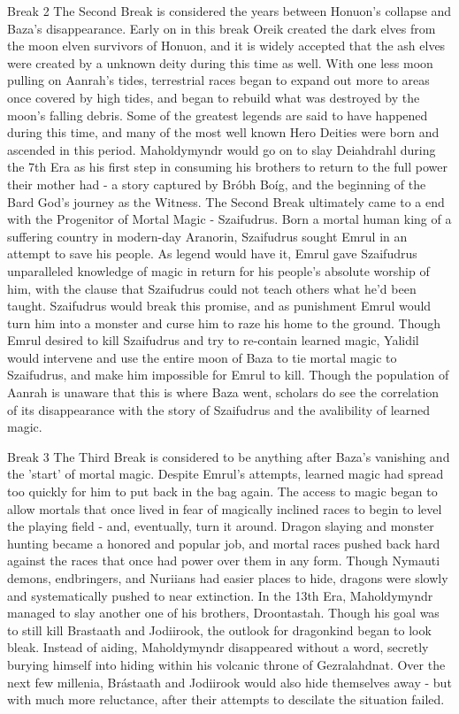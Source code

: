 Break 2
The Second Break is considered the years between Honuon's collapse and Baza's disappearance. Early on in this break Oreik created the dark elves from the moon elven survivors of Honuon, and it is widely accepted that the ash elves were created by a unknown deity during this time as well. With one less moon pulling on Aanrah's tides, terrestrial races began to expand out more to areas once covered by high tides, and began to rebuild what was destroyed by the moon's falling debris.
Some of the greatest legends are said to have happened during this time, and many of the most well known Hero Deities were born and ascended in this period. Maholdymyndr would go on to slay Deiahdrahl during the 7th Era as his first step in consuming his brothers to return to the full power their mother had - a story captured by Bróbh Boíg, and the beginning of the Bard God's journey as the Witness.
The Second Break ultimately came to a end with the Progenitor of Mortal Magic - Szaifudrus. Born a mortal human king of a suffering country in modern-day Aranorin, Szaifudrus sought Emrul in an attempt to save his people. As legend would have it, Emrul gave Szaifudrus unparalleled knowledge of magic in return for his people's absolute worship of him, with the clause that Szaifudrus could not teach others what he'd been taught. Szaifudrus would break this promise, and as punishment Emrul would turn him into a monster and curse him to raze his home to the ground. Though Emrul desired to kill Szaifudrus and try to re-contain learned magic, Yalidil would intervene and use the entire moon of Baza to tie mortal magic to Szaifudrus, and make him impossible for Emrul to kill. Though the population of Aanrah is unaware that this is where Baza went, scholars do see the correlation of its disappearance with the story of Szaifudrus and the avalibility of learned magic.

Break 3
The Third Break is considered to be anything after Baza's vanishing and the 'start' of mortal magic. Despite Emrul's attempts, learned magic had spread too quickly for him to put back in the bag again. The access to magic began to allow mortals that once lived in fear of magically inclined races to begin to level the playing field - and, eventually, turn it around. Dragon slaying and monster hunting became a honored and popular job, and mortal races pushed back hard against the races that once had power over them in any form. Though Nymauti demons, endbringers, and Nuriians had easier places to hide, dragons were slowly and systematically pushed to near extinction.
In the 13th Era, Maholdymyndr managed to slay another one of his brothers, Droontastah. Though his goal was to still kill Brastaath and Jodiirook, the outlook for dragonkind began to look bleak. Instead of aiding, Maholdymyndr disappeared without a word, secretly burying himself into hiding within his volcanic throne of Gezralahdnat. Over the next few millenia, Brástaath and Jodiirook would also hide themselves away - but with much more reluctance, after their attempts to descilate the situation failed.

